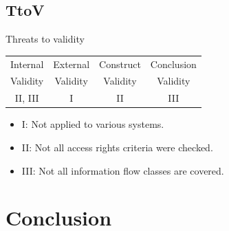 \documentclass[18pt]{beamer}
\begin{document}
\subsection{TtoV}
\begin{frame}{Threats to validity}
\begin{table}
\centering
\begin{tabular}{|c|c|c|c|}
\hline 
Internal & External & Construct & Conclusion \\ 
Validity & Validity & Validity & Validity\\
\hline 
II, III & I & II & III \\ 
\hline 
\end{tabular} 
\end{table}
\begin{itemize}
\item I:   Not  applied to various systems.
\item II:  Not all access rights criteria were checked. 
\item III: Not all information flow classes are covered.
\end{itemize}
\end{frame}



\section{Conclusion}
\end{document}
